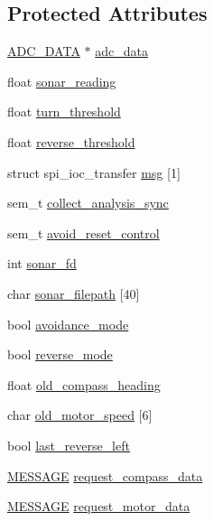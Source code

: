 \subsection*{Protected Attributes}
\begin{DoxyCompactItemize}
\item 
\hyperlink{struct__ADC__DATA}{A\-D\-C\-\_\-\-D\-A\-T\-A} $\ast$ \hyperlink{classSonar_a9e2ea95994eefd09ec7546853ebf1cb7}{adc\-\_\-data}
\item 
float \hyperlink{classSonar_abd3f8ccfc42cacd700df9be06f70c6b2}{sonar\-\_\-reading}
\item 
float \hyperlink{classSonar_a83151cbccbce08be16dfec04a53f3295}{turn\-\_\-threshold}
\item 
float \hyperlink{classSonar_a27714390fb769905062ae587d8b2f112}{reverse\-\_\-threshold}
\item 
struct spi\-\_\-ioc\-\_\-transfer \hyperlink{classSonar_a29863f7d681d8119c233aa11398f65b7}{msg} \mbox{[}1\mbox{]}
\item 
sem\-\_\-t \hyperlink{classSonar_a3dcf7c38af34539c68f123f073eb2f52}{collect\-\_\-analysis\-\_\-sync}
\item 
sem\-\_\-t \hyperlink{classSonar_a6e842fc3ef4088c987a7a348df3b75ce}{avoid\-\_\-reset\-\_\-control}
\item 
int \hyperlink{classSonar_a4799c8b328d7735f7e6d62d741340c6c}{sonar\-\_\-fd}
\item 
char \hyperlink{classSonar_a7db9106da9a50d06b5f25c35f799abe5}{sonar\-\_\-filepath} \mbox{[}40\mbox{]}
\item 
bool \hyperlink{classSonar_a72b11a8e569125119750ee9dd094141b}{avoidance\-\_\-mode}
\item 
bool \hyperlink{classSonar_ad9f288f52d8d26a687a557c714d6f026}{reverse\-\_\-mode}
\item 
float \hyperlink{classSonar_a223e1294a7e00208efcd2a80f57e7620}{old\-\_\-compass\-\_\-heading}
\item 
char \hyperlink{classSonar_a3ee55a9a946c5c00a68b3774c316728e}{old\-\_\-motor\-\_\-speed} \mbox{[}6\mbox{]}
\item 
bool \hyperlink{classSonar_ad51a4f80202f692e4630f74490b5ef5d}{last\-\_\-reverse\-\_\-left}
\item 
\hyperlink{SUBSYS__COMMANDS_8h_ad814416fc1a8c675bea2687d96088a8f}{M\-E\-S\-S\-A\-G\-E} \hyperlink{classSonar_a560057581920d76e557880135548ce46}{request\-\_\-compass\-\_\-data}
\item 
\hyperlink{SUBSYS__COMMANDS_8h_ad814416fc1a8c675bea2687d96088a8f}{M\-E\-S\-S\-A\-G\-E} \hyperlink{classSonar_a5326194659d6f29efa21b6eae03f6a4e}{request\-\_\-motor\-\_\-data}

\end{DoxyCompactItemize}
